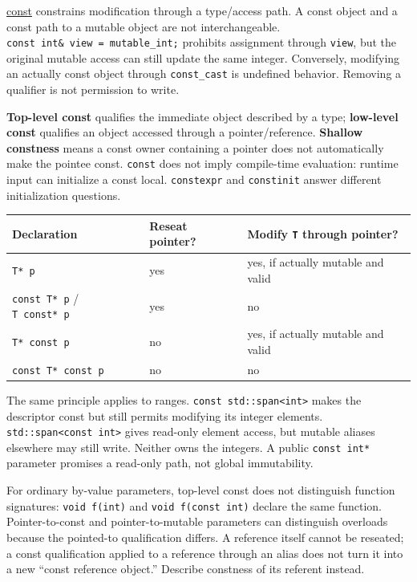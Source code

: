 \hyperref[appendix-c25d60fed375]{const} constrains modification through a type/access path. A const object and a const path to a mutable object are not interchangeable. \texttt{const\ int\&\ view\ =\ mutable\_int;} prohibits assignment through \texttt{view}, but the original mutable access can still update the same integer. Conversely, modifying an actually const object through \texttt{const\_cast} is undefined behavior. Removing a qualifier is not permission to write.

\textbf{Top-level const} qualifies the immediate object described by a type; \textbf{low-level const} qualifies an object accessed through a pointer/reference. \textbf{Shallow constness} means a const owner containing a pointer does not automatically make the pointee const. \texttt{const} does not imply compile-time evaluation: runtime input can initialize a const local. \texttt{constexpr} and \texttt{constinit} answer different initialization questions.

{\def\LTcaptype{none} %
\begin{longtable}[]{@{}lll@{}}
\toprule\noalign{}
Declaration & Reseat pointer? & Modify \texttt{T} through pointer? \\
\midrule\noalign{}
\endhead
\bottomrule\noalign{}
\endlastfoot
\texttt{T*\ p} & yes & yes, if actually mutable and valid \\
\texttt{const\ T*\ p} / \texttt{T\ const*\ p} & yes & no \\
\texttt{T*\ const\ p} & no & yes, if actually mutable and valid \\
\texttt{const\ T*\ const\ p} & no & no \\
\end{longtable}
}

The same principle applies to ranges. \texttt{const\ std::span\textless{}int\textgreater{}} makes the descriptor const but still permits modifying its integer elements. \texttt{std::span\textless{}const\ int\textgreater{}} gives read-only element access, but mutable aliases elsewhere may still write. Neither owns the integers. A public \texttt{const\ int*} parameter promises a read-only path, not global immutability.

For ordinary by-value parameters, top-level const does not distinguish function signatures: \texttt{void\ f(int)} and \texttt{void\ f(const\ int)} declare the same function. Pointer-to-const and pointer-to-mutable parameters can distinguish overloads because the pointed-to qualification differs. A reference itself cannot be reseated; a const qualification applied to a reference through an alias does not turn it into a new ``const reference object.'' Describe constness of its referent instead.


